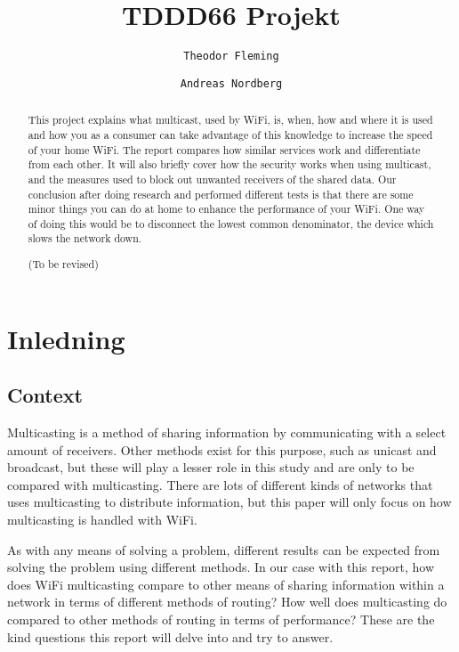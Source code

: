 \documentclass[10pt,a4paper]{article}
\author{
  \texttt{Theodor Fleming}
  \and
  \texttt{Andreas Nordberg}
}
\begin{document}

\title{TDDD66 Projekt}
\maketitle

\cleardoublepage

\begin{abstract}
This project explains what multicast, used by WiFi, is, when, how and where it is used and how you as a consumer can take advantage of this knowledge to increase the speed of your home WiFi. The report compares how similar services work and differentiate from each other. It will also briefly cover how the security works when using multicast, and the measures used to block out unwanted receivers of the shared data.
Our conclusion after doing research and performed different tests is that there are some minor things you can do at home to enhance the performance of your WiFi. One way of doing this would be to disconnect the lowest common denominator, the device which slows the network down. 

(To be revised)
\end{abstract}

\newpage

\section{Inledning}

\subsection{Context}

Multicasting is a method of sharing information by communicating with a select amount of receivers. Other methods exist for this purpose, such as unicast and broadcast, but these will play a lesser role in this study and are only to be compared with multicasting. There are lots of different kinds of networks that uses multicasting to distribute information, but this paper will only focus on how multicasting is handled with WiFi.

As with any means of solving a problem, different results can be expected from solving the problem using different methods. In our case with this report, how does WiFi multicasting compare to other means of sharing information within a network in terms of different methods of routing? How well does multicasting do compared to other methods of routing in terms of performance? These are the kind questions this report will delve into and try to answer.  
\end{document}
